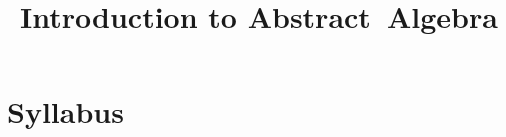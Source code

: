 \documentclass{notes}
\title{Introduction to Abstract~Algebra}
\begin{document}
\section*{Syllabus}
\end{document}
